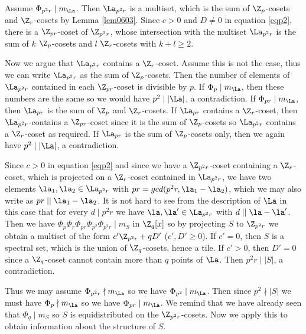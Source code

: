         Assume $\Phi_{p^2r} \mid m_{\La}$. Then $\La_{p^2r}$ is a multiset, which is the sum of $\Z_p$-cosets and $\Z_r$-cosets by Lemma \ref{lem0603}. Since $c>0$ and $D\ne0$ in equation \eqref{eqp2}, there is a $\Z_{pr}$-coset of $\Z_{p^2r}$, whose intersection with the multiset $\La_{p^2r}$ is the sum of $k$ $\Z_p$-cosets and $l$ $\Z_r$-cosets with $k+l \ge 2$. 
        
        Now we argue that $\La_{p^2r}$ contains a $\Z_r$-coset. Assume this is not the case, thus we can write  $\La_{p^2r}$ as the sum of $\Z_p$-cosets. Then the number of elements of $\La_{p^2r}$ contained in each  $\Z_{pr}$-coset is divisible by $p$.
        If $\Phi_p \mid m_{\La}$, then these numbers are the same so we would have $p^2 \mid |\La|$, a contradiction. If $\Phi_{pr} \mid m_{\La}$, then $\La_{pr}$ is the sum of $\Z_p$ and $\Z_r$-cosets. 
        If $\La_{pr}$ contains a $\Z_r$-coset, then $\La_{p^2r}$-contains a $\Z_{pr}$-coset since it is the sum of $\Z_p$-cosets so $\La_{p^2r}$ contains a $\Z_r$-coset as required. 
        If $\La_{pr}$ is the sum of $\Z_p$-cosets only, then we again have $p^2 \mid |\La|$, a contradiction.
        
        Since $c>0$ in equation \eqref{eqp2} and since we have a $\Z_{p^2r}$-coset containing a $\Z_r$-coset, which is projected on a $\Z_r$-coset contained in $\La_{p^2r}$, we have two elements  $\la_1,\la_2 \in \La_{p^2r}$ with $pr=gcd(p^2r,\la_1-\la_2) $, which we may also write as $pr \mid\mid \la_1-\la_2$. 
        It is not hard to see from the description of $\La $ in this case that for every $d \mid p^2r$ we have $\la,\la' \in \La_{p^2r}$ with $d \mid \mid \la-\la'$. 
        Then we have $\Phi_p \Phi_{r}\Phi_{pr}\Phi_{p^2}\Phi_{p^2r} \mid m_{S}$ in $\Z_q[x]$ so by projecting $S$ to $\Z_{p^2r}$ we obtain a multiset of the form $c'\Z_{p^2r}+qD'$ ($c',D' \ge0$). If $c'=0$, then $S$ is a spectral set, which is the union of $\Z_q$-cosets, hence a tile. If $c'>0$, then $D'=0$ since a $\Z_q$-coset cannot contain more than $q$ points of $\La$.
        Then $p^2r \mid |S|$, a contradiction.
        
        Thus we may assume $\Phi_{p^2r} \nmid m_{\La}$ so we have $\Phi_{p^2} \mid m_{\La}$. Then since $p^2 \nmid |S|$ we must have $\Phi_p \nmid m_{\La}$ so we have $\Phi_{pr} \mid m_{\La}$. We remind that we have already seen that $\Phi_q \mid m_S$ so $S$ is equidistributed on the $\Z_{p^2r}$-cosets. 
        Now we apply this to obtain information about the structure of $S$.
        
